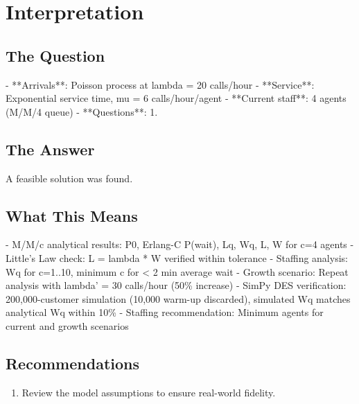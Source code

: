 \documentclass[11pt, a4paper]{article}
\begin{document}
\section{Interpretation}

\subsection{The Question}
- **Arrivals**: Poisson process at lambda = 20 calls/hour
- **Service**: Exponential service time, mu = 6 calls/hour/agent
- **Current staff**: 4 agents (M/M/4 queue)
- **Questions**:
  1.

\subsection{The Answer}

\begin{polyainsight}[title={Bottom Line}]
A feasible solution was found.
\end{polyainsight}

\subsection{What This Means}

- M/M/c analytical results: P0, Erlang-C P(wait), Lq, Wq, L, W for c=4 agents
- Little's Law check: L = lambda * W verified within tolerance
- Staffing analysis: Wq for c=1..10, minimum c for < 2 min average wait
- Growth scenario: Repeat analysis with lambda' = 30 calls/hour (50\% increase)
- SimPy DES verification: 200,000-customer simulation (10,000 warm-up discarded), simulated Wq matches analytical Wq within 10\%
- Staffing recommendation: Minimum agents for current and growth scenarios



\subsection{Recommendations}

\begin{enumerate}
  \item Review the model assumptions to ensure real-world fidelity.
\end{enumerate}
\end{document}
